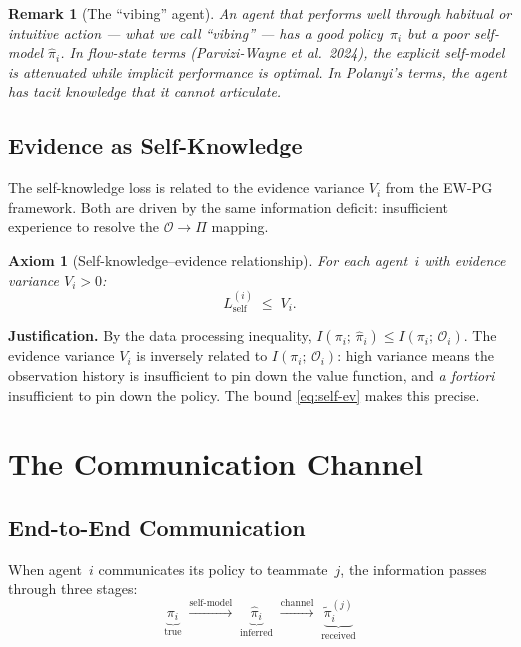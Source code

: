 \documentclass[11pt]{article}
\newtheorem{remark}[theorem]{Remark}
\newtheorem{axiom_}{Axiom}[section]
\begin{document}
\begin{remark}[The ``vibing'' agent]
An agent that performs well through habitual or intuitive action --- what
we call ``vibing'' --- has a good policy~$\pi_i$ but a poor self-model
$\hat{\pi}_i$. In flow-state terms (Parvizi-Wayne et al.\ 2024), the
explicit self-model is attenuated while implicit performance is optimal.
In Polanyi's terms, the agent has \emph{tacit knowledge} that it cannot
articulate.
\end{remark}

\subsection{Evidence as Self-Knowledge}

The self-knowledge loss is related to the evidence variance $V_i$ from
the EW-PG framework. Both are driven by the same information deficit:
insufficient experience to resolve the $\mathcal{O} \to \Pi$ mapping.

\begin{axiom_}[Self-knowledge--evidence relationship]\label{ax:self-ev}
For each agent~$i$ with evidence variance $V_i > 0$:
\begin{equation}\label{eq:self-ev}
  L_{\text{self}}^{(i)} \;\leq\; V_i.
\end{equation}
\end{axiom_}

\noindent\textbf{Justification.}
By the data processing inequality,
$I(\pi_i;\, \hat{\pi}_i) \leq I(\pi_i;\, \mathcal{O}_i)$.
The evidence variance $V_i$ is inversely related to $I(\pi_i;\, \mathcal{O}_i)$:
high variance means the observation history is insufficient to pin down
the value function, and \emph{a fortiori} insufficient to pin down the policy.
The bound \eqref{eq:self-ev} makes this precise.


\section{The Communication Channel}

\subsection{End-to-End Communication}

When agent~$i$ communicates its policy to teammate~$j$, the information
passes through three stages:
\begin{equation}\label{eq:comm-chain}
  \underbrace{\pi_i}_{\text{true}} \;\xrightarrow{\text{self-model}}\;
  \underbrace{\hat{\pi}_i}_{\text{inferred}} \;\xrightarrow{\text{channel}}\;
  \underbrace{\tilde{\pi}_i^{(j)}}_{\text{received}}
\end{equation}
\end{document}
